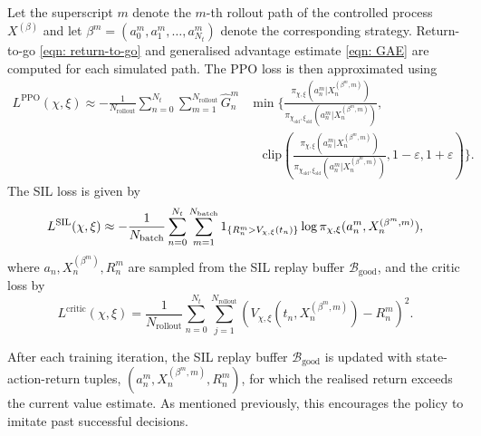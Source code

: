 Let the superscript $m$ denote the $m$-th rollout path of the controlled process $X^{(\beta)}$ and let $\beta^m=(a_0^m, a_1^m, \ldots, a_{N_t}^m)$ denote the corresponding strategy. Return-to-go \eqref{eqn: return-to-go} and generalised advantage estimate \eqref{eqn: GAE} are computed for each simulated path. The PPO loss is then approximated using
\begin{align}
    L^{\text{PPO}}(\chi, \xi) \approx-\frac{1}{N_{\text{rollout}}} \sum_{n=0}^{N_t}\sum_{m=1}^{N_{\text{rollout}}} \hat G_n^m & \min \Bigg\{ \frac{\pi_{\chi, \xi}(a_n^m | X^{(\beta^m,m)}_n)}{\pi_{\chi_\text{old}, \xi_\text{old}}(a_n^m |X^{(\beta^m,m)}_n)}, \nonumber \\ 
    & \quad \text{clip}\left( \frac{\pi_{\chi, \xi}(a_n^m | X^{(\beta^m,m)}_n)}{\pi_{\chi_\text{old}, \xi_\text{old}}(a_n^m |X^{(\beta^m,m)}_n)}, 1-\varepsilon, 1+\varepsilon \right)\Bigg\}.
    \label{eqn: L-PPO approximate}
\end{align}
The SIL loss is given by
\begin{equation}
    L^{\text{SIL}}(\chi,\xi) \approx -\frac{1}{N_{\text{batch}}} \sum_{n=0}^{N_t}\sum_{m=1}^{N_{\text{batch}}} 1_{\left\{R_n^m > V_{\chi,\xi}(t_n)\right\}} \log \pi_{\chi, \xi}(a_n^m, X^{(\beta^m,m)}_n),
    \label{eqn: L-SIL approximate}
\end{equation}
where $a_n,X_n^{(\beta^m)},R_n^m$ are sampled from the SIL replay buffer $\mathcal{B}_{\text{good}}$, and the critic loss by
\begin{equation}
    L^{\text{critic}}(\chi,\xi) = \frac{1}{N_{\text{rollout}}} \sum_{n=0}^{N_t} \sum_{j=1}^{N_{\text{rollout}}} \left(V_{\chi,\xi}(t_n,X_n^{(\beta^m,m)}) - R_n^m\right)^2.
    \label{eqn: L-critic approximate}
\end{equation}

After each training iteration, the SIL replay buffer $\mathcal{B}_{\text{good}}$ is updated with state-action-return tuples, $(a_n^m,X_n^{(\beta^m,m)},R_n^m)$, for which the realised return exceeds the current value estimate. As mentioned previously, this encourages the policy to imitate past successful decisions.

